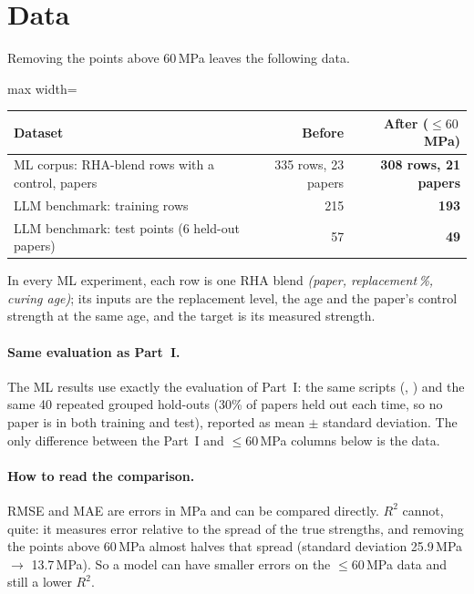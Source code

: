 \documentclass[11pt]{article}
\newcommand{\R}{$R^2$}
\begin{document}
\section{Data}
\label{sec:p3-data}
Removing the points above 60\,MPa leaves the following data.

\begin{center}\small
\begin{adjustbox}{max width=\linewidth}
\begin{tabular}{lrr}
\toprule
Dataset & Before & After ($\leq60$\,MPa) \\
\midrule
ML corpus: RHA-blend rows with a control, papers & 335 rows, 23 papers & \textbf{308 rows, 21 papers} \\
LLM benchmark: training rows & 215 & \textbf{193} \\
LLM benchmark: test points (6 held-out papers) & 57 & \textbf{49} \\
\bottomrule
\end{tabular}
\end{adjustbox}
\end{center}

\noindent In every ML experiment, each row is one RHA blend
\emph{(paper, replacement\,\%, curing age)}; its inputs are the replacement level, the
age and the paper's control strength at the same age, and the target is its measured
strength.

\paragraph{Same evaluation as Part~I.} The ML results use exactly the evaluation of
Part~I: the same scripts (, ) and the same 40
repeated grouped hold-outs (30\% of papers held out each time, so no paper is in both
training and test), reported as mean $\pm$ standard deviation. The only difference
between the Part~I and $\leq60$\,MPa columns below is the data.

\paragraph{How to read the comparison.} RMSE and MAE are errors in MPa and can be
compared directly. \R{} cannot, quite: it measures error relative to the spread of the
true strengths, and removing the points above 60\,MPa almost halves that spread (standard
deviation 25.9\,MPa $\to$ 13.7\,MPa). So a model can have smaller errors on the
$\leq60$\,MPa data and still a lower \R{}.
\end{document}

